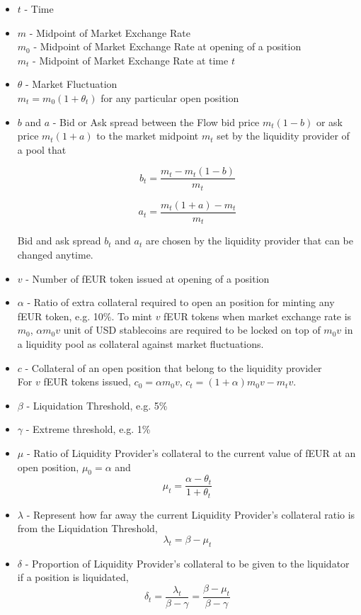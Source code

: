 \documentclass{article}
\begin{document}
\begin{itemize}

  \item $t$ - Time
  
  \item $m$ - Midpoint of Market Exchange Rate\\
  $m_0$ - Midpoint of Market Exchange Rate at opening of a position\\
  $m_t$ - Midpoint of Market Exchange Rate at time $t$
  
  \item $\theta$ - Market Fluctuation\\
  $m_t=m_0(1+\theta_t)$ for any particular open position

  \item $b$ and $a$ -  Bid or Ask spread between the Flow bid price $m_t(1-b)$ or ask price $m_t(1+a)$ to the market midpoint $m_t$ set by the liquidity provider of a pool that
  
  $$b_t=\frac{m_t-m_t(1-b)}{m_t}$$

  $$a_t=\frac{m_t(1+a)-m_t}{m_t}$$
  
  Bid and ask spread $b_t$ and $a_t$ are chosen by the liquidity provider that can be changed anytime. 

  \item $v$ -  Number of fEUR token issued at opening of a position
  
  \item $\alpha$ - Ratio of extra collateral required to open an position for minting any fEUR token, e.g. 10\%. To mint $v$ fEUR tokens when market exchange rate is $m_0$, $\alpha m_0v$ unit of USD stablecoins are required to be locked on top of $m_0 v$ in a liquidity pool as collateral against market fluctuations. 

  \item $c$ - Collateral of an open position that belong to the liquidity provider\\
  For $v$ fEUR tokens issued, $c_0=\alpha m_0v$, $c_t=(1+\alpha)m_0v - m_tv$. 

  \item $\beta$ - Liquidation Threshold, e.g. 5\%

  \item $\gamma$ - Extreme threshold, e.g. 1\%

  \item $\mu$ - Ratio of Liquidity Provider's collateral to the current value of fEUR at an open position, $\mu_0=\alpha$ and
  $$ \mu_t=\frac{\alpha - \theta_t}{1+\theta_t}$$

  \item $\lambda$ - Represent how far away the current Liquidity Provider's collateral ratio is from the Liquidation Threshold, $$\lambda_t=\beta-\mu_t$$
  
  \item $\delta$ - Proportion of Liquidity Provider's collateral to be given to the liquidator if a position is liquidated, 
  $$ \delta_t=\frac{\lambda_t}{\beta-\gamma}=\frac{\beta-\mu_t}{\beta-\gamma}$$
  
 \end{itemize}
\end{document}
